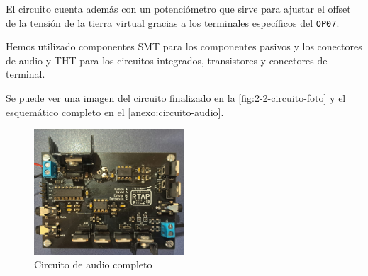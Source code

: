 El circuito cuenta además con un potenciómetro que sirve para ajustar el offset de la tensión de la tierra virtual gracias a los terminales específicos del \texttt{OP07}.

Hemos utilizado componentes SMT para los componentes pasivos y los conectores de audio y THT para los circuitos integrados, transistores y conectores de terminal.

Se puede ver una imagen del circuito finalizado en la \autoref{fig:2-2-circuito-foto} y el esquemático completo en el \autoref{anexo:circuito-audio}.

\begin{figure}[h]
    \centering
    \includegraphics[width=0.5\textwidth]{images/2/2-2/circuito-foto.jpg}
    \caption{Circuito de audio completo}
    \label{fig:2-2-circuito-foto}
\end{figure}